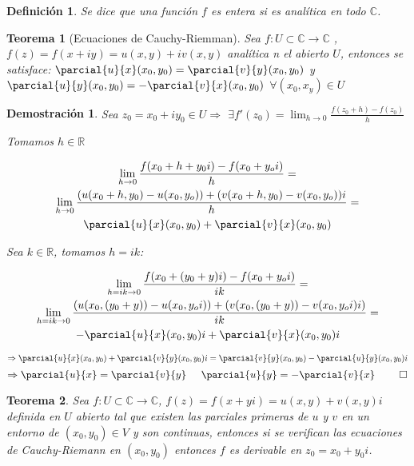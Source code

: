 \documentclass[12pt]{book}
\newtheorem{defi}{Definición}[chapter]
\newtheorem{theorem}{Teorema}[chapter]
\newtheorem*{dem}{Demostración}
\newcommand{\deriv}{\displaystyle \lim_{h\to 0} \frac{f(z_0+h)-f(z_0)}{h}}
\newcommand{\R}{\mathbb{R}}
\newcommand{\C}{\mathbb{C}}
\newcommand{\f}{f: U\subset \C \longrightarrow \C}
\begin{document}
\begin{defi}
Se dice que una función $f$ es entera si es analítica en todo $\C$.
\end{defi}

\begin{theorem}[Ecuaciones de Cauchy-Riemman]
Sea $f: U \subset \C \longrightarrow \C$ , $f(z) = f(x+iy) = u(x,y) + iv(x,y)$ analítica n el abierto $U$, entonces se satisface:
$\parcial{u}{x}(x_0,y_0) = \parcial{v}{y}(x_0,y_0)$ y $\parcial{u}{y}(x_0,y_0) = -\parcial{v}{x}(x_0,y_0)$ $ \forall(x_0,x_y) \in U$
\end{theorem}

\begin{dem}
Sea $z_0 = x_0 + iy_0 \in U \Rightarrow$ $\exists f'(z_0) = \deriv$

Tomamos $h \in \R$

\begin{multline*}
\lim_{h\to 0} \frac{f(x_0+h+y_0i)-f(x_0+y_oi)}{h} =\\
 \lim_{h\to 0}\frac{(u(x_0+h,y_0)-u(x_0,y_o)) + (v(x_0+h,y_0)-v(x_0,y_o))i}{h} =\\
  \parcial{u}{x}(x_0,y_0) + \parcial{v}{x}(x_0,y_0)
  \end{multline*}


Sea $k \in\R$, tomamos $h=ik$:

\begin{multline*}
\lim_{h=ik\to 0} \frac{f(x_0+(y_0+y)i)-f(x_0+y_oi)}{ik} =\\
 \lim_{h=ik\to 0} \frac{(u(x_0,(y_0+y))-u(x_0,y_oi))+(v(x_0,(y_0+y))-v(x_0,y_oi)i)}{ik} =\\
  -\parcial{u}{x}(x_0,y_0)i + \parcial{v}{x}(x_0,y_0)i
  \end{multline*}

$$
\Rightarrow \parcial{u}{x}(x_0,y_0) + \parcial{v}{y}(x_0,y_0)i = \parcial{v}{y}(x_0,y_0) - \parcial{u}{y}(x_0,y_0)i
$$
$$
\Rightarrow \parcial{u}{x} = \parcial{v}{y} \hspace{0.5cm} \parcial{u}{y} = -\parcial{v}{x}\ \qed
$$
\end{dem}


\begin{theorem}
Sea $\f$, $f(z) = f(x+yi) = u(x,y)+ v(x,y)i$ definida en $U$ abierto tal que existen las parciales primeras de $u$ y $v$ en un entorno de $(x_0,y_0) \in V$ y son continuas, entonces si se verifican las ecuaciones de Cauchy-Riemann en $(x_0,y_0)$ entonces $f$ es derivable en $z_0 = x_0 + y_0i$.
\end{theorem}
\end{document}
